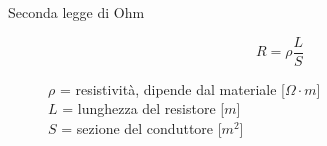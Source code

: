 \documentclass[a4paper,11pt,italian]{article}
\begin{document}
\begin{description}
%   
%   
%   
%   
  
  \item[Seconda legge di Ohm] 
  \[ R = \rho \frac{L}{S} \]
  \begin{multicols}{2}
  $ \rho $ = resistività, dipende dal materiale [$ \Omega \cdot m $]\\
  $ L $ = lunghezza del resistore [$ m $]\\
  $ S $ = sezione del conduttore [$ m^2 $]
  \end{multicols}
  

\end{description}
\end{document}

